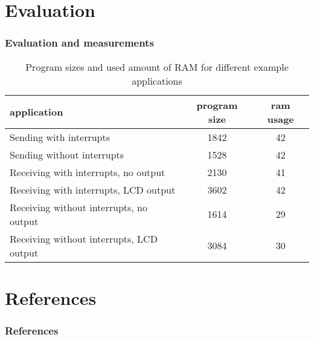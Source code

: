 \documentclass{beamer}
\begin{document}
\section{Evaluation}
\begin{frame}
	\frametitle{Evaluation and measurements}
	\begin{table}
	\begin{tabular}[ht]{|l|cc|}
		\hline
		application								& program size 	& ram usage \\
		\hline
		Sending with interrupts					& 1842			& 42 		\\
		Sending without interrupts				& 1528			& 42 		\\
		Receiving with interrupts, no output	& 2130			& 41 		\\
		Receiving with interrupts, LCD output	& 3602			& 42 		\\
		Receiving without interrupts, no output	& 1614			& 29 		\\
		Receiving without interrupts, LCD output& 3084			& 30 		\\
		\hline
	\end{tabular}
	\caption{Program sizes and used amount of RAM for different example applications}
	\end{table}
\end{frame}

\section{References}
\begin{frame}
	\frametitle{References}
	
	
\end{frame}
\end{document}
